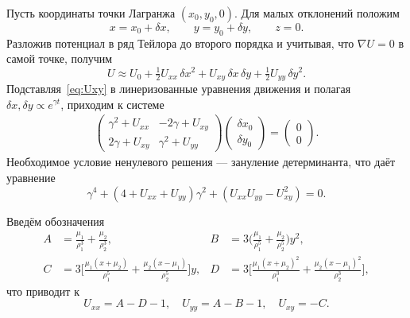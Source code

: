 \documentclass[12pt]{article}
\newcommand{\muone}{\mu_1}
\newcommand{\mutwo}{\mu_2}
\begin{document}
Пусть координаты точки Лагранжа $(x_0,y_0,0)$. Для малых отклонений положим
\begin{equation}\tag{1097--1099}
  x=x_0+\delta x,\qquad y=y_0+\delta y,\qquad z=0.
\end{equation}
Разложив потенциал в ряд Тейлора до второго порядка и учитывая, что $\nabla U=0$ в самой точке, получим
\begin{equation}\tag{1101}\label{eq:Uxy}
  U\approx U_0+\tfrac12 U_{xx}\,\delta x^{2}+U_{xy}\,\delta x\,\delta y+\tfrac12 U_{yy}\,\delta y^{2}.
\end{equation}
Подставляя~\eqref{eq:Uxy} в линеризованные уравнения движения и полагая $\delta x,\delta y\propto e^{\gamma t}$, приходим к системе
\begin{align}\tag{1104}\label{eq:matrix}
  \begin{pmatrix}
    \gamma^{2}+U_{xx} & -2\gamma+U_{xy}\\[4pt]
    2\gamma+U_{xy} & \gamma^{2}+U_{yy}
  \end{pmatrix}
  \begin{pmatrix}\delta x_0\\ \delta y_0\end{pmatrix}=\begin{pmatrix}0\\0\end{pmatrix}.
\end{align}
Необходимое условие ненулевого решения — зануление детерминанта, что даёт уравнение
\begin{equation}\tag{1105}\label{eq:quartic}
  \gamma^{4}+(4+U_{xx}+U_{yy})\gamma^{2}+(U_{xx}U_{yy}-U_{xy}^{2})=0.
\end{equation}

Введём обозначения
\begin{align}\tag{1106--1109}
  A &= \frac{\muone}{\rho_1^{3}}+\frac{\mutwo}{\rho_2^{3}}, &
  B &= 3\bigl(\frac{\muone}{\rho_1^{5}}+\frac{\mutwo}{\rho_2^{5}}\bigr)y^{2},\\
  C &= 3\bigl[\frac{\muone(x+\mutwo)}{\rho_1^{5}}+\frac{\mutwo(x-\muone)}{\rho_2^{5}}\bigr]y, &
  D &= 3\bigl[\frac{\muone(x+\mutwo)^{2}}{\rho_1^{3}}+\frac{\mutwo(x-\muone)^{2}}{\rho_2^{3}}\bigr],
\end{align}
что приводит к
\begin{equation}\tag{1110--1112}
  U_{xx}=A-D-1,\quad U_{yy}=A-B-1,\quad U_{xy}=-C.
\end{equation}
\end{document}
